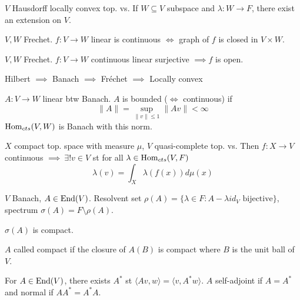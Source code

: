 \begin{theorem} $V$ Hausdorff locally convex top. vs. If $ W \subseteq V$ subspace and $\lambda : W \to F$, there exist an extension on $V$.
\end{theorem}

\begin{theorem} $V, W$ Frechet. $f : V \to W$ linear is continuous $\iff$ graph of $f$ is closed in $V \times W$.
\end{theorem}

\begin{theorem} $V, W$ Frechet. $f : V \to W$ continuous linear surjective $\implies f$ is open.
\end{theorem}

\begin{proposition} Hilbert $ \implies $ Banach $ \implies $ Fréchet $ \implies $ Locally convex
\end{proposition}

\begin{definition} $A : V \to W$ linear btw Banach. $A$ is bounded ($ \iff $ continuous) if
\[
\|A\| = \sup_{\|v\| \leq 1} \|Av\| < \infty
\]
$\operatorname{Hom}_{cts}(V, W)$ is Banach with this norm.
\end{definition}

\begin{theorem} $X$ compact top. space with measure $ \mu$, $V$ quasi-complete top. vs. Then $f : X \to V$ continuous $\implies \ \exists! v \in V$ st for all $ \lambda \in \operatorname{Hom}_{cts}(V,F)$
\[
\lambda (v) = \int_X \lambda (f(x)) d\mu(x)
\]
\end{theorem}

\begin{definition}  $V$ Banach, $A \in \operatorname{End}(V)$. Resolvent set $\rho (A) = \{\lambda \in F : A - \lambda id_V \text{ bijective}\}$, spectrum $\sigma (A) = F \setminus \rho (A)$.
\end{definition}

\begin{proposition} $ \sigma (A)$ is compact.
\end{proposition}

\begin{definition} $A$ called compact if the closure of $A(B)$ is compact where $B$ is the unit ball of $V$.
\end{definition}

\begin{definition} For $A \in \operatorname{End}(V)$, there exists $A^*$ st $\langle Av, w \rangle = \langle v, A^* w \rangle$. $A$ self-adjoint if $A = A^*$ and normal if $AA^* = A^* A$.
\end{definition}


